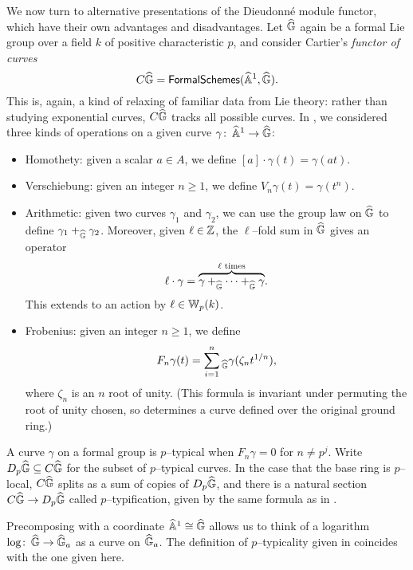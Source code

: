 We now turn to alternative presentations of the Dieudonn\'e module functor, which have their own advantages and disadvantages.  Let $\widehat{\mathbb G}$ again be a formal Lie group over a field $k$ of positive characteristic $p$, and consider Cartier's \textit{functor of curves} \[C\widehat{\mathbb G} = \mathsf{FormalSchemes}(\widehat{\mathbb{A}}^1, \widehat{\mathbb G}).\]  This is, again, a kind of relaxing of familiar data from Lie theory: rather than studying exponential curves, $C\widehat{\mathbb G}$ tracks all possible curves.  In , we considered three kinds of operations on a given curve $\gamma\colon\thinspace \widehat{\mathbb{A}}^1 \to \widehat{\mathbb G}$:
\begin{itemize}
\item Homothety: given a scalar $a \in A$, we define $[a] \cdot \gamma(t) = \gamma(at)$.
\item Verschiebung: given an integer $n \ge 1$, we define $V_n \gamma(t) = \gamma(t^n)$.
\item Arithmetic: given two curves $\gamma_1$ and $\gamma_2$, we can use the group law on $\widehat{\mathbb G}$ to define $\gamma_1 +_{\widehat{\mathbb G}} \gamma_2$.  Moreover, given $\ell \in \mathbb Z$, the $\ell$--fold sum in $\widehat{\mathbb G}$ gives an operator \[\ell \cdot \gamma = \overset{\text{$\ell$ times}}{\overbrace{\gamma +_{\widehat{\mathbb G}} \cdots +_{\widehat{\mathbb G}} \gamma}}.\]  This extends to an action by $\ell \in \mathbb W_p(k)$.
\item Frobenius: given an integer $n \ge 1$, we define \[F_n \gamma(t) = \sum_{i=1}^n{}_{\widehat{\mathbb G}} \gamma(\zeta_n t^{1/n}),\] where $\zeta_{n}$ is an $n${\th} root of unity.  (This formula is invariant under permuting the root of unity chosen, so determines a curve defined over the original ground ring.)
\end{itemize}

\begin{definition}
A curve $\gamma$ on a formal group is $p$--typical when $F_n \gamma = 0$ for $n \ne p^j$.  Write $D_p\widehat{\mathbb G} \subseteq C\widehat{\mathbb G}$ for the subset of $p$--typical curves.  In the case that the base ring is $p$--local, $C\widehat{\mathbb G}$ splits as a sum of copies of $D_p \widehat{\mathbb G}$, and there is a natural section $C\widehat{\mathbb G} \to D_p \widehat{\mathbb G}$ called $p$--typification, given by the same formula as in .
\end{definition}

\begin{remark}
Precomposing with a coordinate $\widehat{\mathbb{A}}^1 \cong \widehat{\mathbb G}$ allows us to think of a logarithm $\log\colon\thinspace \widehat{\mathbb G} \to \widehat{\mathbb G}_a$ as a curve on $\widehat{\mathbb G}_a$.  The definition of $p$--typicality given in  coincides with the one given here.
\end{remark}

